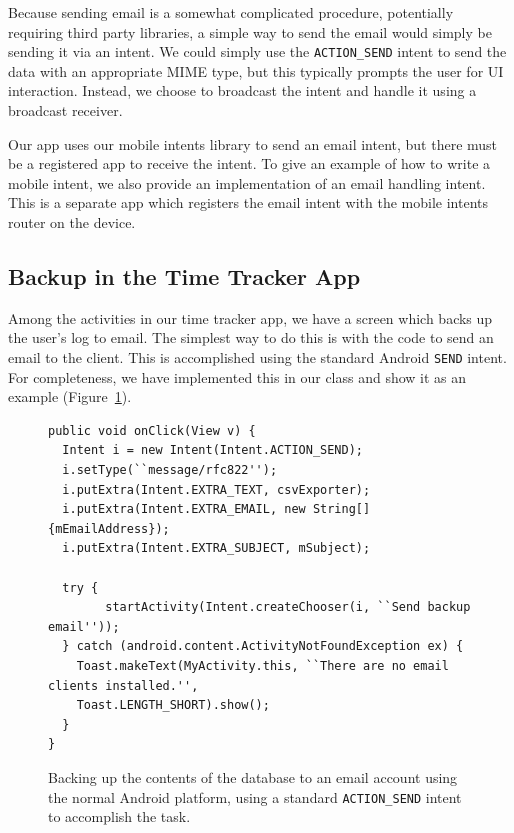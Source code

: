 \documentclass{acm_proc_article-sp}
\begin{document}
Because sending email is a somewhat complicated procedure, potentially
requiring third party libraries, a simple way to send the email would
simply be sending it via an intent.  We could simply use the
\texttt{ACTION\_SEND} intent to send the data with an appropriate MIME
type, but this typically prompts the user for UI interaction.
Instead, we choose to broadcast the intent and handle it using a
broadcast receiver.

Our app uses our mobile intents library to send an email intent, but
there must be a registered app to receive the intent.  To give an
example of how to write a mobile intent, we also provide an
implementation of an email handling intent.  This is a separate app
which registers the email intent with the mobile intents router on the
device.

\subsection{Backup in the Time Tracker App}

Among the activities in our time tracker app, we have a screen which
backs up the user's log to email.  The simplest way to do this is with
the code to send an email to the client.  This is accomplished using
the standard Android \texttt{SEND} intent.  For completeness, we have
implemented this in our class and show it as an example
(Figure~\ref{fig:send-email-intent}).

\begin{figure}
  \begin{lstlisting}
public void onClick(View v) {
  Intent i = new Intent(Intent.ACTION_SEND);
  i.setType(``message/rfc822'');
  i.putExtra(Intent.EXTRA_TEXT, csvExporter);
  i.putExtra(Intent.EXTRA_EMAIL, new String[]{mEmailAddress});
  i.putExtra(Intent.EXTRA_SUBJECT, mSubject);
      
  try {
        startActivity(Intent.createChooser(i, ``Send backup email''));
  } catch (android.content.ActivityNotFoundException ex) {
    Toast.makeText(MyActivity.this, ``There are no email clients installed.'',
    Toast.LENGTH_SHORT).show();
  }
}
  \end{lstlisting}
  \caption{Backing up the contents of the database to an email account
    using the normal Android platform, using a standard
    \texttt{ACTION\_SEND} intent to accomplish the task.}
  \label{fig:send-email-intent}

\end{figure}
\end{document}
